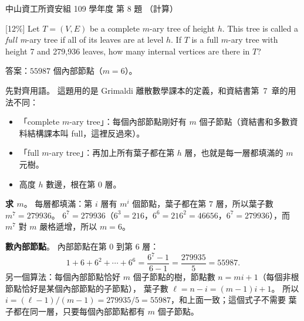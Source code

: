 \begin{pastexam}[label={px:nsysu-109-dmalg-05}]{中山資工所資安組 109 學年度 第 8 題}
（計算）

{[12\%]} Let $T=(V,E)$ be a complete $m$-ary tree of height $h$. This tree is called a \textit{full
m}-ary tree if all of its leaves are at level $h$. If $T$ is a full $m$-ary tree with height 7 and
279,936 leaves, how many internal vertices are there in $T$?
\end{pastexam}

\begin{pastsoln}
答案：$55987$ 個內部節點（$m = 6$）。

先對齊用語。 這題用的是 Grimaldi 離散數學課本的定義，和資結書第~7~章的用法不同：
\begin{itemize}
\item 「complete $m$-ary tree」：每個內部節點剛好有 $m$ 個子節點（資結書和多數資料結構課本叫 full，這裡反過來）。
\item 「full $m$-ary tree」：再加上所有葉子都在第 $h$ 層，也就是每一層都填滿的 $m$ 元樹。
\item 高度 $h$ 數邊，根在第 $0$ 層。
\end{itemize}

\textbf{求 $m$}。 每層都填滿：第 $i$ 層有 $m^i$ 個節點，葉子都在第 $7$ 層，所以葉子數 $m^7 = 279936$。
$6^7 = 279936$（$6^3 = 216$，$6^6 = 216^2 = 46656$，$6^7 = 279936$），而 $m^7$ 對 $m$ 嚴格遞增，所以 $m = 6$。

\textbf{數內部節點}。 內部節點在第 $0$ 到第 $6$ 層：
\[
1 + 6 + 6^2 + \cdots + 6^6 = \frac{6^7 - 1}{6 - 1} = \frac{279935}{5} = 55987 .
\]
另一個算法：每個內部節點恰好 $m$ 個子節點的樹，節點數 $n = mi + 1$（每個非根節點恰好是某個內部節點的子節點），
葉子數 $\ell = n - i = (m - 1)i + 1$。 所以 $i = (\ell - 1)/(m - 1) = 279935/5 = 55987$，和上面一致；這個式子不需要
葉子都在同一層，只要每個內部節點都有 $m$ 個子節點。
\end{pastsoln}
